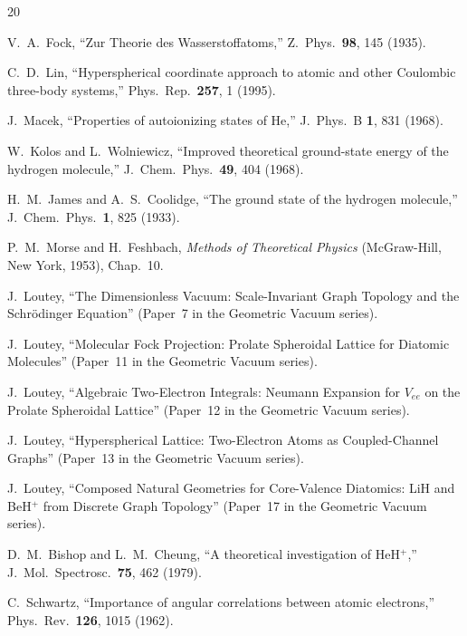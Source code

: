 \documentclass[aps,pra,twocolumn,superscriptaddress,longbibliography]{revtex4-2}
\begin{document}
\begin{thebibliography}{20}

V.~A.~Fock,
``Zur Theorie des Wasserstoffatoms,''
Z.~Phys.\ \textbf{98}, 145 (1935).

C.~D.~Lin,
``Hyperspherical coordinate approach to atomic and other
Coulombic three-body systems,''
Phys.\ Rep.\ \textbf{257}, 1 (1995).

J.~Macek,
``Properties of autoionizing states of He,''
J.~Phys.\ B \textbf{1}, 831 (1968).

W.~Kolos and L.~Wolniewicz,
``Improved theoretical ground-state energy of the hydrogen molecule,''
J.~Chem.\ Phys.\ \textbf{49}, 404 (1968).

H.~M.~James and A.~S.~Coolidge,
``The ground state of the hydrogen molecule,''
J.~Chem.\ Phys.\ \textbf{1}, 825 (1933).

P.~M.~Morse and H.~Feshbach,
\emph{Methods of Theoretical Physics}
(McGraw-Hill, New York, 1953), Chap.~10.

J.~Loutey,
``The Dimensionless Vacuum: Scale-Invariant Graph Topology
and the Schr\"odinger Equation'' (Paper~7 in the Geometric Vacuum series).

J.~Loutey,
``Molecular Fock Projection: Prolate Spheroidal Lattice
for Diatomic Molecules'' (Paper~11 in the Geometric Vacuum series).

J.~Loutey,
``Algebraic Two-Electron Integrals: Neumann Expansion
for $V_{ee}$ on the Prolate Spheroidal Lattice''
(Paper~12 in the Geometric Vacuum series).

J.~Loutey,
``Hyperspherical Lattice: Two-Electron Atoms as
Coupled-Channel Graphs'' (Paper~13 in the Geometric Vacuum series).

J.~Loutey,
``Composed Natural Geometries for Core-Valence Diatomics:
LiH and BeH$^+$ from Discrete Graph Topology''
(Paper~17 in the Geometric Vacuum series).

D.~M.~Bishop and L.~M.~Cheung,
``A theoretical investigation of HeH$^+$,''
J.~Mol.\ Spectrosc.\ \textbf{75}, 462 (1979).

C.~Schwartz,
``Importance of angular correlations between atomic electrons,''
Phys.\ Rev.\ \textbf{126}, 1015 (1962).

\end{thebibliography}
\end{document}
